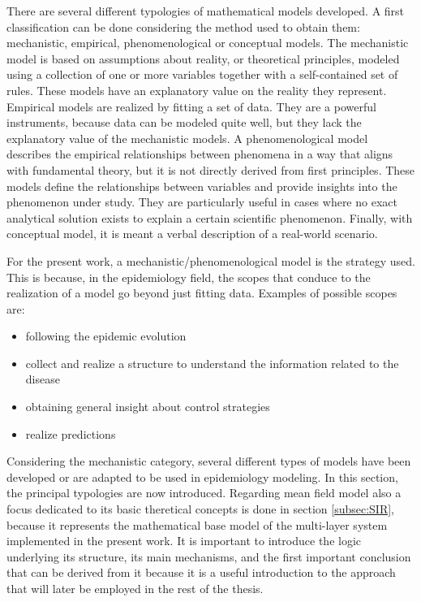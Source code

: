 There are several different typologies of mathematical models developed.
A first classification can be done considering the method used to obtain them: mechanistic, empirical, phenomenological or conceptual models.
The mechanistic model is based on assumptions about reality, or theoretical principles, modeled using a collection of one or more variables together with a self-contained set of rules. These models have an explanatory value on the reality they represent.
Empirical models are realized by fitting a set of data. They are a powerful instruments, because data can be modeled quite well, but they lack the explanatory value of the mechanistic models.
A phenomenological model describes the empirical relationships between phenomena in a way that aligns with fundamental theory, but it is not directly derived from first principles. These models define the relationships between variables and provide insights into the phenomenon under study. They are particularly useful in cases where no exact analytical solution exists to explain a certain scientific phenomenon.
Finally, with conceptual model, it is meant a verbal description of a real-world scenario. 

For the present work, a mechanistic/phenomenological model is the strategy used.  This is because, in the epidemiology field, the scopes that conduce to the realization of a model go beyond just fitting data. Examples of possible scopes are:
\begin{itemize}
	\item following the epidemic evolution
	\item collect and realize a structure to understand the information related to the disease 
	\item obtaining general insight about control strategies
	\item realize predictions
\end{itemize}
Considering the mechanistic category, several different types of models have been developed or are adapted to be used in epidemiology modeling. In this section, the principal typologies are now introduced. 
Regarding mean field model also a focus dedicated to its basic theretical concepts is done in section \ref{subsec:SIR}, because it represents the mathematical base model of the multi-layer system implemented in the present work. 
It is important to introduce the logic underlying its structure, its main mechanisms, and the first important conclusion that can be derived from it because it is a useful introduction to the approach that will later be employed in the rest of the thesis.

